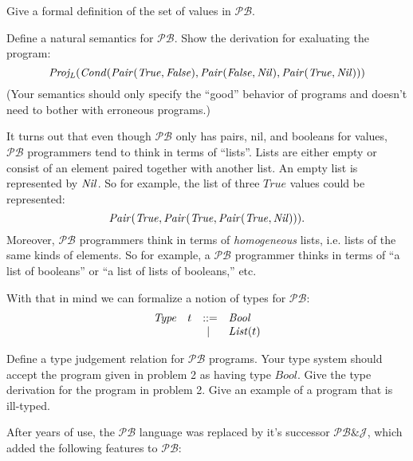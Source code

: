 \documentclass[11pt]{article}
\newcommand\Bool{\mathit{Bool}}
\newcommand\True{\mathit{True}}
\newcommand\False{\mathit{False}}
\newcommand\Plang{\mathcal{PB}}
\newcommand\PPlang{\mathcal{PB\&J}}
\begin{document}
\newpage
\begin{exercise}
Give a formal definition of the set of values in $\Plang$.
\end{exercise}
\vspace{1.2in}

\begin{exercise}
Define a natural semantics for $\Plang$. Show the derivation for
exaluating the program:
\[
\ProjL(\Cond(\Cons(\True,\False),\Cons(\False,\Nil),\Cons(\True,\Nil)))
\]
%
(Your semantics should only specify the ``good'' behavior of programs
and doesn't need to bother with erroneous programs.)
\end{exercise}

\newpage
It turns out that even though $\Plang$ only has pairs, nil, and
booleans for values, $\Plang$ programmers tend to think in terms of
``lists''.  Lists are either empty or consist of an element paired
together with another list.  An empty list is represented by $\mathit{Nil}$.  So
for example, the list of three $\True$ values could be represented:
\[
\Cons(\True,\Cons(\True,\Cons(\True,\Nil)))\text.
\]
%
Moreover, $\Plang$ programmers think in terms of \emph{homogeneous}
lists, i.e. lists of the same kinds of elements.  So for example, a
$\Plang$ programmer thinks in terms of ``a list of booleans'' or ``a
list of lists of booleans,'' etc.

With that in mind we can formalize a notion of types for $\Plang$:
\[
\begin{array}{lrcll}
 \mathit{Type} 
               & t & ::= & \Bool\\
               &   &  |\ & \List(t)
\end{array}
\]

\vspace{.5in}

\begin{exercise}
Define a type judgement relation for $\Plang$ programs.  Your type
system should accept the program given in problem 2 as having type
$\Bool$.  Give the type derivation for the program in problem 2.  Give
an example of a program that is ill-typed.
\end{exercise}


\newpage
After years of use, the $\Plang$ language was replaced by it's
successor $\PPlang$, which added the following features to $\Plang$:
\end{document}

